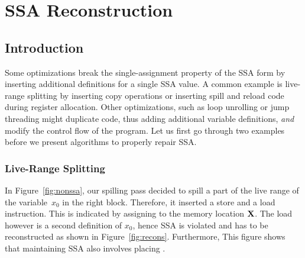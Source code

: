 


\chapter{SSA Reconstruction }
\label{chapter:repair_maintain_ssa_after_optimization}
\graphicspath{{repair_maintain_ssa_after_optimization/}{part1/repair_maintain_ssa_after_optimization/}}



\section{Introduction}

Some optimizations break the single-assignment property of the SSA form by inserting additional definitions for a single SSA value.
A common example is live-range splitting by inserting copy operations or inserting spill and reload code during register allocation.
Other optimizations, such as loop unrolling or jump threading might duplicate code, thus adding additional variable definitions, \emph{and} modify the control flow of the program.
Let us first go through two examples before we present algorithms to properly repair SSA.

\subsection{Live-Range Splitting}

In Figure~\ref{fig:nonssa}, our spilling pass decided to spill a part of the live range of the variable~$x_0$ in the right block.
Therefore, it inserted a store and a load instruction. 
This is indicated by assigning to the memory location $\textbf X$.
The load however is a second definition of $x_0$, hence SSA is violated and has to be reconstructed as shown in Figure~\ref{fig:recons}.
Furthermore, This figure shows that maintaining SSA also involves placing \phifuns.

